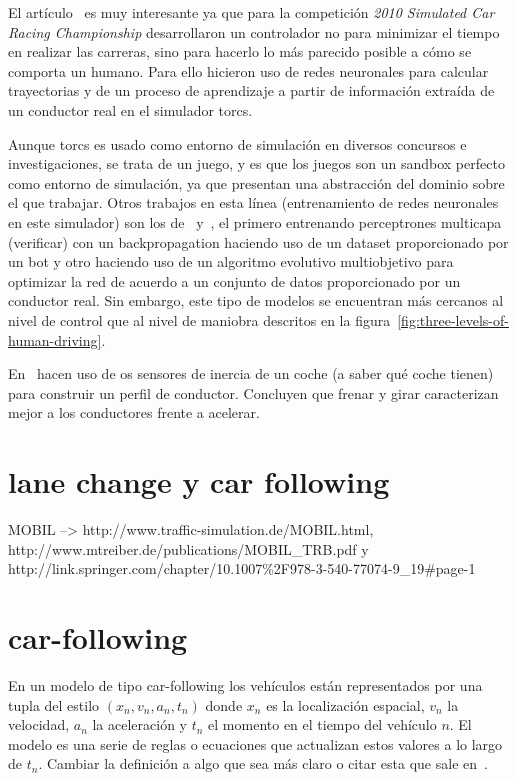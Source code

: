 El artículo~\cite{munoz2010human} es muy interesante ya que para la competición \textit{2010 Simulated Car Racing Championship} desarrollaron un controlador no para minimizar el tiempo en realizar las carreras, sino para hacerlo lo más parecido posible a cómo se comporta un humano. Para ello hicieron uso de redes neuronales para calcular trayectorias y de un proceso de aprendizaje a partir de información extraída de un conductor real en el simulador \gls{torcs}.

Aunque \gls{torcs} es usado como entorno de simulación en diversos concursos e investigaciones, se trata de un juego, y es que los juegos son un sandbox perfecto como entorno de simulación, ya que presentan una abstracción del dominio sobre el que trabajar. Otros trabajos en esta línea (entrenamiento de redes neuronales en este simulador) son los de~\cite{munoz2009controller} y~\cite{van2009robust}, el primero entrenando perceptrones multicapa (\TODO verificar) con un backpropagation haciendo uso de un dataset proporcionado por un bot y otro haciendo uso de un algoritmo evolutivo multiobjetivo para optimizar la red de acuerdo a un conjunto de datos proporcionado por un conductor real. Sin embargo, este tipo de modelos se encuentran más cercanos al nivel de control que al nivel de maniobra descritos en la figura~\ref{fig:three-levels-of-human-driving}.

En~\cite{van2013driver} hacen uso de os sensores de inercia de un coche (a saber qué coche tienen) para construir un perfil de conductor. Concluyen que frenar y girar caracterizan mejor a los conductores frente a acelerar.

\section{lane change y car following}

MOBIL --> http://www.traffic-simulation.de/MOBIL.html, http://www.mtreiber.de/publications/MOBIL\_TRB.pdf y http://link.springer.com/chapter/10.1007\%2F978-3-540-77074-9\_19\#page-1

\section{car-following}

En un modelo de tipo car-following los vehículos están representados por una tupla del estilo $(x_n, v_n, a_n, t_n)$ donde $x_n$ es la localización espacial, $v_n$ la velocidad, $a_n$ la aceleración y $t_n$ el momento en el tiempo del vehículo $n$. El modelo es una serie de reglas o ecuaciones que actualizan estos valores a lo largo de $t_n$. Cambiar la definición a algo que sea más claro o citar esta que sale en~\cite{Aghabayk2015}.

